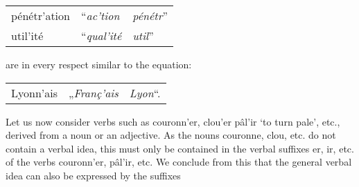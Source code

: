 {    \begin{center}
      \begin{tabular}[t]{l@{ = }l@{ [type] }l}
        \textup{pénétr'ation} &  ``\emph{ac'tion} & \emph{pénétr}''\\
        \textup{util'ité} & ``\emph{qual'ité} & \emph{util}''
      \end{tabular}
    \end{center}
    
    \noindent
    are in every respect similar to the equation:

    \begin{center}
      \begin{tabular}[t]{l@{ = }l@{ [type] }l}
        \textup{Lyonn'ais} & „\emph{Franç'ais} & \emph{Lyon}“.
      \end{tabular}
    \end{center}

    Let us now consider verbs such as \textup{couronn'er},
    \textup{clou'er} \textup{pâl'ir} `to turn pale', etc., derived
    from a noun or an adjective. As the nouns \textup{couronne},
    \textup{clou}, etc. do not contain a verbal idea, this must only
    be contained in the verbal suffixes \textup{er}, \textup{ir},
    etc. of the verbs \textup{couronn'er}, \textup{pâl'ir}, etc. We
    conclude from this that the general verbal idea can also be
    expressed by the suffixes
    }

